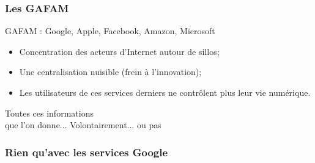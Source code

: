 \documentclass{beamer}
\begin{document}
\begin{frame}
\frametitle{Les GAFAM}
GAFAM : Google, Apple, Facebook, Amazon, Microsoft
\begin{itemize}
\item Concentration des acteurs d’Internet autour de sillos;
\item Une centralisation nuisible (frein à l'innovation);
\item  Les utilisateurs de ces services derniers ne contrôlent plus leur vie numérique.
\end{itemize}
\end{frame}

\begin{frame}
\begin{center}
\Huge{Toutes ces informations \\ que l'on donne... }
\Huge{Volontairement...}
\Huge{ou pas}
\end{center}
\end{frame}

\begin{frame}
\frametitle{Rien qu'avec les services Google}

\begin{itemize}
\end{itemize}
\end{frame}
\end{document}
